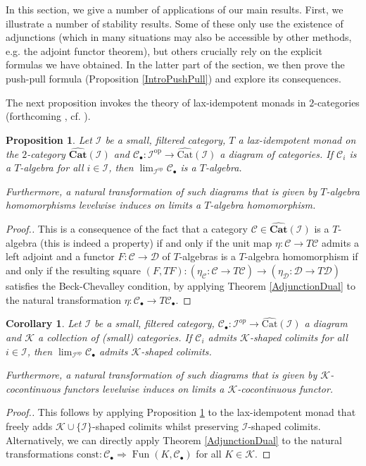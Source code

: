 \documentclass[a4paper,reqno,10pt]{amsart}
\newtheorem{proposition}[theorem]{Proposition}
\newtheorem{corollary}[theorem]{Corollary}
\theoremstyle{definition}
\theoremstyle{remark}
\newcommand{\br}[1]{\left(#1\right)}
\newcommand{\C}{\mathcal{C}}
\newcommand{\D}{\mathcal{D}}
\newcommand{\I}{\mathcal{I}}
\newcommand{\K}{\mathcal{K}}
\newcommand{\const}{\mathrm{const}}
\newcommand{\Fun}{\operatorname{Fun}}
\newcommand{\Cat}{\mathrm{Cat}}
\newcommand{\op}{\mathrm{op}}
\newcommand{\singlequote}[1]{\textquotesingle #1\textquotesingle}
\begin{document}
In this section, we give a number of applications of our main results. First, we illustrate a number of \singlequote{stability} results. Some of these only use the existence of adjunctions (which in many situations may also be accessible by other methods, e.g. the adjoint functor theorem), but others crucially rely on the explicit formulas we have obtained. In the latter part of the section, we then prove the push-pull formula (Proposition \ref{IntroPushPull}) and explore its consequences.

The next proposition invokes the theory of lax-idempotent monads in $2$-categories (forthcoming \cite{AbellanBlom}, cf. \cite{BlomSlides}).
\begin{proposition}\label{LaxIdempotentMonads}
Let $\I$ be a small, filtered category, $T$ a lax-idempotent monad on the $2$-category $\widehat{\mathbf{Cat}}\br{\I}$ and $\C_{\bullet}\colon\I^{\op}\rightarrow\widehat{\Cat}\br{\I}$ a diagram of categories. If $\C_i$ is a $T$-algebra for all $i\in\I$, then $\lim_{\I^{\op}}\C_{\bullet}$ is a $T$-algebra.

Furthermore, a natural transformation of such diagrams that is given by $T$-algebra homomorphisms levelwise induces on limits a $T$-algebra homomorphism.
\end{proposition}
\begin{proof}[Proof.]
This is a consequence of the fact that a category $\C\in\widehat{\mathbf{Cat}}(\I)$ is a $T$-algebra (this is indeed a property) if and only if the unit map $\eta\colon\C\rightarrow T\C$ admits a left adjoint and a functor $F\colon\C\rightarrow\D$ of $T$-algebras is a $T$-algebra homomorphism if and only if the resulting square $(F,TF)\colon(\eta_{\C}\colon\C\rightarrow T\C)\rightarrow(\eta_{\D}\colon\D\rightarrow T\D)$ satisfies the Beck-Chevalley condition, by applying Theorem \ref{AdjunctionDual} to the natural transformation $\eta\colon\C_{\bullet}\rightarrow T\C_{\bullet}$.
\end{proof}

\begin{corollary}\label{ApplicationCocomplete}
Let $\I$ be a small, filtered category, $\C_{\bullet}\colon\I^{op}\rightarrow\widehat{\Cat}\br{\I}$ a diagram and $\K$ a collection of (small) categories. If $\C_i$ admits $\K$-shaped colimits for all $i\in\I$, then $\lim_{\I^{\op}}\C_{\bullet}$ admits $\K$-shaped colimits.

Furthermore, a natural transformation of such diagrams that is given by $\K$-cocontinuous functors levelwise induces on limits a $\K$-cocontinuous functor.
\end{corollary}
\begin{proof}[Proof.]
This follows by applying Proposition \ref{LaxIdempotentMonads} to the lax-idempotent monad that freely adds $\K\cup\{\I\}$-shaped colimits whilst preserving $\I$-shaped colimits. Alternatively, we can directly apply Theorem \ref{AdjunctionDual} to the natural transformations $\const\colon\C_{\bullet}\Rightarrow\Fun(K,\C_{\bullet})$ for all $K\in\K$.
\end{proof}
\end{document}
